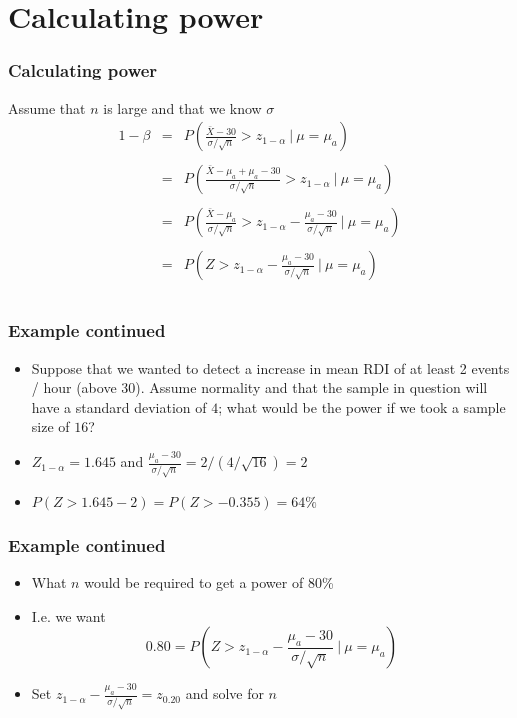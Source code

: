 \documentclass[aspectratio=169]{beamer}
\begin{document}
\section{Calculating power}
\begin{frame}\frametitle{Calculating power} 
Assume that $n$ is large and that we know $\sigma$
\begin{eqnarray*}
1 -\beta & = & 
P\left(\frac{\bar X - 30}{\sigma /\sqrt{n}} > z_{1-\alpha} ~|~ \mu = \mu_a \right)\\ \\
& = & P\left(\frac{\bar X - \mu_a + \mu_a - 30}{\sigma /\sqrt{n}} > z_{1-\alpha} ~|~ \mu = \mu_a \right)\\ \\
& = & P\left(\frac{\bar X - \mu_a}{\sigma /\sqrt{n}} > z_{1-\alpha} - \frac{\mu_a - 30}{\sigma /\sqrt{n}} ~|~ \mu = \mu_a \right)\\ \\
& = & P\left(Z > z_{1-\alpha} - \frac{\mu_a - 30}{\sigma /\sqrt{n}} ~|~ \mu = \mu_a \right)\\ \\
\end{eqnarray*}
\end{frame}

\begin{frame}\frametitle{Example continued}
\begin{itemize}
\item Suppose that we wanted to detect a increase in mean RDI
  of at least 2 events / hour (above 30). Assume normality and
  that the sample in question will have a standard deviation of $4$;
  what would be the power if we took a sample size of $16$? \\
\item $Z_{1-\alpha} = 1.645$ and $\frac{\mu_a - 30}{\sigma /\sqrt{n}} = 2 / (4 /\sqrt{16}) = 2$ \\
\item $P(Z > 1.645 - 2) = P(Z > -0.355) = 64\%$
\end{itemize}
\end{frame}

\begin{frame}\frametitle{Example continued}
\begin{itemize}
\item What $n$ would be required to get a power of 80\%
\item I.e. we want
$$0.80 = P\left(Z > z_{1-\alpha} - \frac{\mu_a - 30}{\sigma /\sqrt{n}} ~|~ \mu = \mu_a \right)$$
\item Set $z_{1-\alpha} - \frac{\mu_a - 30}{\sigma /\sqrt{n}} = z_{0.20}$ and solve for $n$
\end{itemize}
\end{frame}
\end{document}
